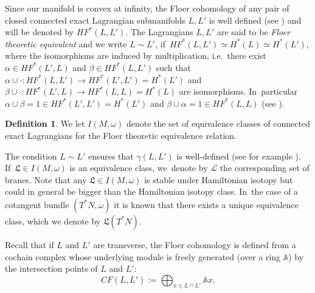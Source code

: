 \documentclass[10pt,a4paper]{amsart}
\newcommand{\ie}{i.e.\ }
\theoremstyle{definition}
\newtheorem{defn}[thm]{Definition}
\newcommand {\LL}{{\mathcal L}}
\newcommand{\fL}{\mathfrak {L}}
\begin{document}
Since our manifold is convex at infinity, the Floer cohomology of any pair of closed connected
exact Lagrangian submanifolds $L,L'$ is well defined (see \cite{Floer-Lag-intersection, McDuff-contact-boundaries, Viterbo-FunctorsI}) and will be denoted by $HF^*(L,L')$. The Lagrangians $L, L'$ are said to be \emph{Floer theoretic equivalent} and we write $L\sim L'$, if~$HF^*(L,L')\simeq
H^*(L)\simeq H^*(L')$, where the isomorphisms are induced by multiplication, \ie there exist $\alpha \in HF^*(L',L)$ and $\beta \in HF^*(L,L')$ such that $\alpha \cup\cdot : HF^*(L,L') \to HF^*(L',L')=H^*(L')$ and $\beta \cup \cdot : HF^*(L',L) \to HF^*(L,L)=H^*(L)$ are isomorphisms. In~particular $\alpha\cup \beta =1\in HF^*(L',L')=H^*(L')$ and $\beta \cup \alpha=1 \in HF^*(L,L)$ (see \cite[Def.\,3.5]{Abouzaid-Kragh}).

\begin{defn} We let $I(M,\omega)$ denote the set of equivalence classes of connected exact Lagrangians for the Floer theoretic equivalence relation.
\end{defn}

The condition $L\sim L'$ ensures that $\gamma(L,L')$ is well-defined (see for example \cite{shelukhin-sc-viterbo}). If~$\fL\in I(M,\omega)$ is an equivalence class, we~denote by $\LL$ the corresponding set of branes. Note that any $\fL\in I(M,\omega)$ is stable under Hamiltonian isotopy but could in general be bigger than the Hamiltonian isotopy class. In~the case of a cotangent bundle $(T^*N, \omega)$ it is known \cite{Fukaya-Seidel-Smith, Kragh-Abouzaid} that there exists a unique equivalence class, which we denote by $\fL(T^*N)$.


\setcounter{thm}{3}

Recall that if $L$ and $L'$ are transverse, the Floer cohomology is defined from a cochain complex whose underlying module is freely generated (over a ring $\mathbb{A}$) by the intersection points of $L$ and $L'$:
\[
CF(L,L'):=\bigoplus_{x\in L\cap L'}\mathbb{A}x.
\]
\end{document}
